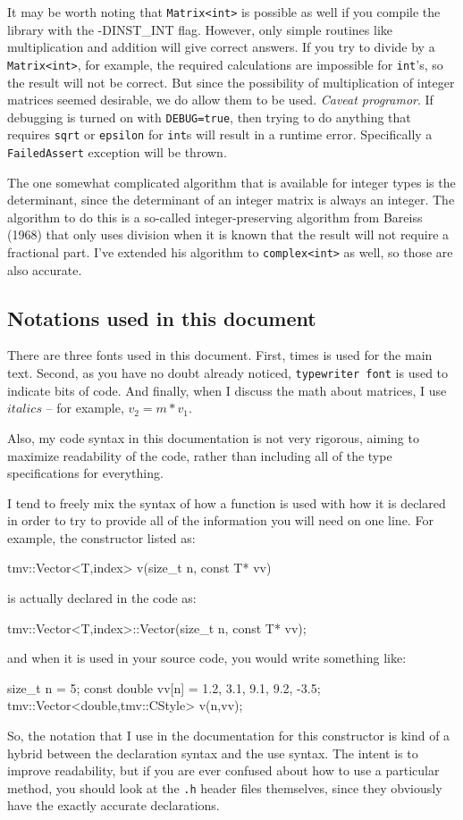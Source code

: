 \documentclass[twoside,letterpaper,11pt]{article}
\renewcommand{\tt}[1]{{\lstinline {#1}}}
\begin{document}
It may be worth noting that \tt{Matrix<int>} is possible as well if you compile the library
with the -DINST\_INT flag. 
However, only simple 
routines like multiplication and addition will give correct answers.  If you try to 
divide by a \tt{Matrix<int>}, for example, the required calculations are impossible 
for \tt{int}'s,
so the result will not be correct.  But since the possibility of multiplication of 
integer matrices seemed desirable, we do allow them to be used.  
\emph{Caveat programor}.  If debugging is turned on with \tt{DEBUG=true}, 
then trying to do anything that requires
\tt{sqrt} or \tt{epsilon} for \tt{int}s will result in a runtime error.  Specifically a 
\tt{FailedAssert} exception will be thrown.

The one somewhat complicated algorithm that is available for integer types is
the determinant, since the determinant of an integer matrix is always an integer.
The algorithm to do this is a so-called integer-preserving algorithm from Bareiss (1968)
that only uses division when it is known that the result will not require a fractional part.
I've extended his algorithm to \tt{complex<int>} as well, so those are also accurate.

\subsection {Notations used in this document}

There are three fonts used in this document.  First, times is used for the main text.  
Second, as you have no doubt already noticed, \tt{typewriter font} is used to 
indicate bits of code.  And finally, when I discuss the math about matrices, I 
use $italics$ -- for example, $v_2 = m * v_1$.

Also, my code syntax in this documentation is not very rigorous, aiming to maximize
readability of the code, rather than including all of the type specifications for everything.

I tend to freely mix the syntax of how a function is used with how
it is declared in order to try to provide all of the information you will need on one line.  
For example, the constructor listed as:
\begin{tmvcode}
tmv::Vector<T,index> v(size_t n, const T* vv)
\end{tmvcode}
is actually declared in the code as:
\begin{tmvcode}
tmv::Vector<T,index>::Vector(size_t n, const T* vv);
\end{tmvcode}
and when it is used in your source code, you would write something like:
\begin{tmvcode}
size_t n = 5;
const double vv[n] = {1.2, 3.1, 9.1, 9.2, -3.5};
tmv::Vector<double,tmv::CStyle> v(n,vv);
\end{tmvcode}
So, the notation that I use in the documentation for this constructor is kind of a hybrid between the declaration syntax and the use syntax.  The intent is to improve readability, but
if you are ever confused about how to use a particular method, you should look at
the \tt{.h} header files themselves, since they obviously have the exactly accurate
declarations.  
\end{document}
